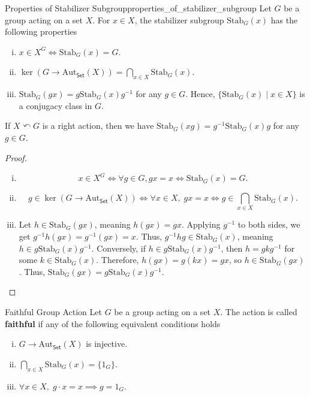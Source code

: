 \begin{proposition}{Properties of Stabilizer Subgroup}{properties_of_stabilizer_subgroup}
    Let $G$ be a group acting on a set $X$. For $x\in X$, the stabilizer subgroup $\mathrm{Stab}_G(x)$ has the following properties
    \begin{enumerate}[(i)]
        \item $x\in X^G\iff \mathrm{Stab}_G(x)=G$.
        \item $\ker \left(G\to \mathrm{Aut}_{\mathsf{Set}}(X)\right)=\bigcap\limits_{x\in X}\mathrm{Stab}_G(x)$.
        \item $\mathrm{Stab}_G(gx)=g\mathrm{Stab}_G(x)g^{-1}$ for any $g\in G$. Hence, $\{\mathrm{Stab}_G(x)\mid x\in X\}$ is a conjugacy class in $G$.
    \end{enumerate}
    If $X \curvearrowleft G$ is a right action, then we have $\mathrm{Stab}_G(xg)=g^{-1}\mathrm{Stab}_G(x)g$ for any $g\in G$.
\end{proposition}
\begin{proof}
    \begin{enumerate}[(i)]
        \item 
        $$
        x \in X^G \iff \forall g \in G, gx = x \iff \mathrm{Stab}_G(x) = G.
        $$
        \item 
        $$
        g \in \ker \left(G \to \mathrm{Aut}_{\mathsf{Set}}(X) \right) \iff  \forall x \in X ,\; gx = x \iff g \in \bigcap_{x \in X} \mathrm{Stab}_G(x).
        $$    
        \item  Let $h \in \mathrm{Stab}_G(gx)$, meaning $h(gx) = gx$.
        Applying $g^{-1}$ to both sides, we get $g^{-1}h(gx) = g^{-1}(gx)=x$. Thus, $g^{-1}hg \in \mathrm{Stab}_G(x)$, meaning $h \in g \mathrm{Stab}_G(x) g^{-1}$.
        Conversely, if $h \in g \mathrm{Stab}_G(x) g^{-1}$, then $h = g k g^{-1}$ for some $k \in \mathrm{Stab}_G(x)$. Therefore, $h(gx) = g(kx) = gx$, so $h \in \mathrm{Stab}_G(gx)$.
        Thus, $\mathrm{Stab}_G(gx) = g \mathrm{Stab}_G(x) g^{-1}$.
    \end{enumerate}
\end{proof}


\begin{definition}{Faithful Group Action}{}
    Let $G$ be a group acting on a set $X$. The action is called \textbf{faithful} if any of the following equivalent conditions holds
    \begin{enumerate}[(i)]
        \item $G\to \mathrm{Aut}_{\mathsf{Set}}(X)$ is injective.
        \item $\bigcap\limits_{x\in X}\mathrm{Stab}_G(x)=\{ 1_G\}$.
        \item $\forall x\in X,\;g\cdot x=x\implies g=1_G$.
    \end{enumerate}
\end{definition}


